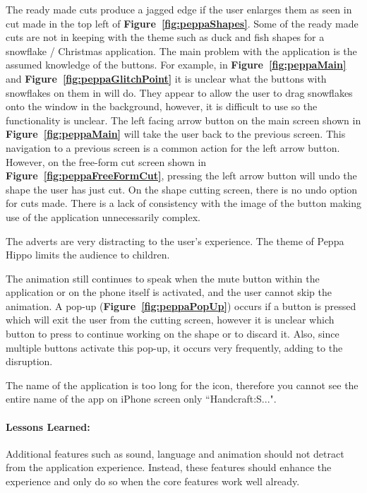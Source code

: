 \documentclass[11pt]{article}
\begin{document}
                    The ready made cuts produce a jagged edge if the user enlarges them as seen in cut made in the top left of \textbf{Figure~\ref{fig:peppaShapes}}. Some of the ready made cuts are not in keeping with the theme such as duck and fish shapes for a snowflake / Christmas application. 
                    The main problem with the application is the assumed knowledge of the buttons. For example, in \textbf{Figure~\ref{fig:peppaMain}} and \textbf{Figure~\ref{fig:peppaGlitchPoint}} it is unclear what the buttons with snowflakes on them in will do. They appear to allow the user to drag snowflakes onto the window in the background, however, it is difficult to use so the functionality is unclear. The left facing arrow button on the main screen shown in \textbf{Figure~\ref{fig:peppaMain}} will take the user back to the previous screen. This navigation to a previous screen is a common action for the left arrow button. However, on the free-form cut screen shown in \textbf{Figure~\ref{fig:peppaFreeFormCut}}, pressing the left arrow button will undo the shape the user has just cut.
                 On the shape cutting screen, there is no undo option for cuts made. There is a lack of consistency with the image of the button making use of the application unnecessarily complex.
                
                The adverts are very distracting to the user's experience. The theme of Peppa Hippo limits the audience to children. 
                
                The animation still continues to speak when the mute button within the application or on the phone itself is activated, and the user cannot skip the animation. A pop-up (\textbf{Figure~\ref{fig:peppaPopUp}}) occurs if a button is pressed which will exit the user from the cutting screen, however it is unclear which button to press to continue working on the shape or to discard it. Also, since multiple buttons activate this pop-up, it occurs very frequently, adding to the disruption.
                
                The name of the application is too long for the icon, therefore you cannot see the entire name of the app on iPhone screen only ``Handcraft:S...".
                
                \paragraph{Lessons Learned:}   
                Additional features such as sound, language and animation should not detract from the application experience. Instead, these features should enhance the experience and only do so when the core features work well already. 
                
\end{document}
